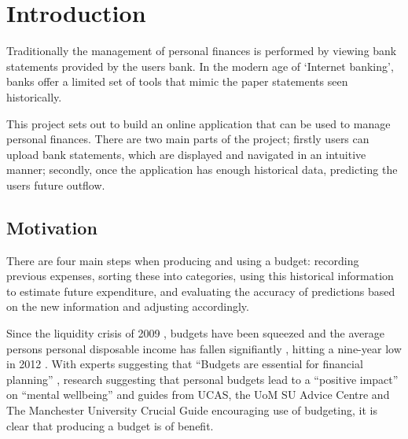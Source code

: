 \chapter{Introduction}
\label{cha:introduction}

\begin{comment}
This chapter puts the work into context. Having read it, the reader should be left in no doubt as to:

- the topic area to which the work applies
- why the work is being done
- what else has been done in the area and by whom
 - how the author proposes to tackle the problem: The project proposal is often expressed in terms of a main objective and possibly one or more additional objectives. It is useful to define "milestones" or "sub-goals" that mark the progress towards the objectives. 
 - It is common to end this chapter with a brief overview of each of the subsequent chapters of the report.
\end{comment}

Traditionally the management of personal finances is performed by viewing bank statements provided by the users bank. In the modern age of `Internet banking', banks offer a limited set of tools that mimic the paper statements seen historically.

This project sets out to build an online application that can be used to manage personal finances. There are two main parts of the project; firstly users can upload bank statements, which are displayed and navigated in an intuitive manner; secondly, once the application has enough historical data, predicting the users future outflow.

\section{Motivation}
There are four main steps when producing and using a budget: recording previous expenses, sorting these into categories, using this historical information to estimate future expenditure, and evaluating the accuracy of predictions based on the new information and adjusting accordingly.

Since the liquidity crisis of 2009 \parencite{gore2010}, budgets have been squeezed and the average persons personal disposable income has fallen signifiantly , hitting a nine-year low in 2012 \parencite{barnard2012households}. With experts suggesting that ``Budgets are essential for financial planning'' \parencite{wsj2013budget}, research suggesting that personal budgets lead to a ``positive impact'' on ``mental wellbeing'' \parencite{tlap2013budget} and guides from UCAS, the UoM SU Advice Centre and The Manchester University Crucial Guide encouraging use of budgeting, it is clear that producing a budget is of benefit.  

